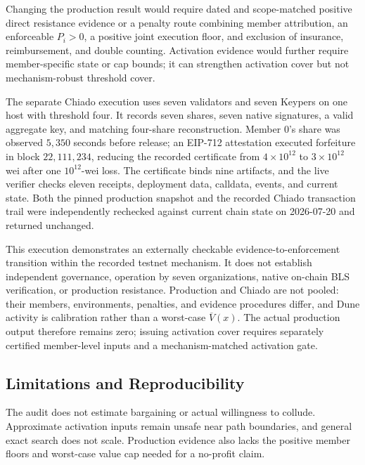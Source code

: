 Changing the production result would require dated and scope-matched positive
direct resistance evidence or a penalty route combining member attribution,
an enforceable \(P_i>0\), a positive joint execution floor, and exclusion of
insurance, reimbursement, and double counting. Activation evidence would
further require member-specific state or cap bounds; it can strengthen
activation cover but not mechanism-robust threshold cover.

The separate Chiado execution uses seven validators and seven Keypers on one
host with threshold four. It records seven shares, seven native signatures, a
valid aggregate key, and matching four-share reconstruction. Member \(0\)'s
share was observed \(5{,}350\) seconds before release; an EIP-712 attestation
executed forfeiture in block \(22{,}111{,}234\), reducing the recorded
certificate from \(4\times10^{12}\) to \(3\times10^{12}\) wei after one
\(10^{12}\)-wei loss. The certificate binds nine artifacts, and the live
verifier checks eleven receipts, deployment data, calldata, events, and current
state. Both the pinned production snapshot and the recorded Chiado transaction
trail were independently rechecked against current chain state on 2026-07-20
and returned unchanged.

This execution demonstrates an externally checkable evidence-to-enforcement
transition within the recorded testnet mechanism. It does not establish
independent governance, operation by seven organizations, native on-chain BLS
verification, or production resistance. Production and Chiado are not pooled:
their members, environments, penalties, and evidence procedures differ, and
Dune activity is calibration rather than a worst-case
\(\overline V(x)\). The actual production output therefore remains zero;
issuing activation cover requires separately certified member-level inputs and
a mechanism-matched activation gate.

\subsection{Limitations and Reproducibility}

The audit does not estimate bargaining or actual willingness to collude.
Approximate activation inputs remain unsafe near path boundaries, and general
exact search does not scale. Production evidence also lacks the positive
member floors and worst-case value cap needed for a no-profit claim.

